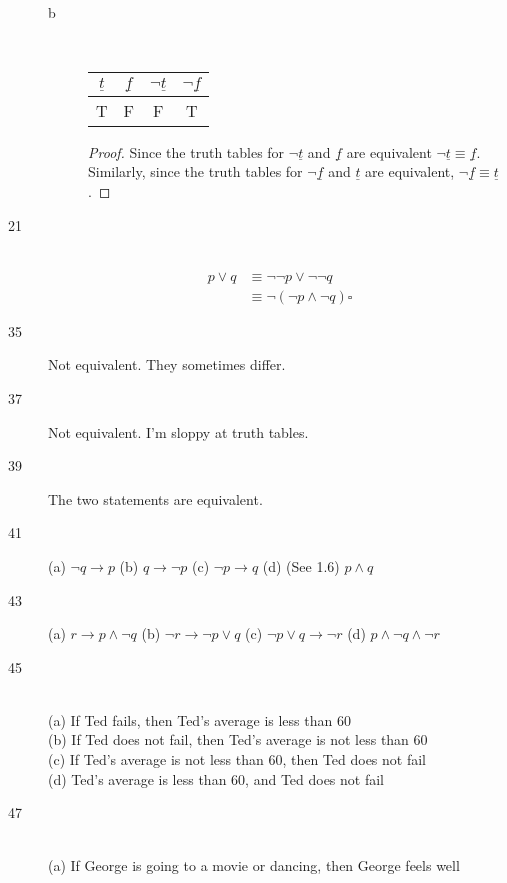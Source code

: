 \begin{description}
\begin{description}
			\item[b] \hfill \\
				\begin{tabular}{c | c | c | c}
					$\underline{t}$ & %
					$\underline{f}$ & %
					$\lnot \underline{t}$ & %
					$\lnot \underline{f}$ \\ %
					\hline
					T & F & F & T \\
				\end{tabular}
				\begin{proof}
					Since the truth tables for $\lnot \underline{t}$ and $\underline{f}$
					are equivalent $\lnot \underline{t} \equiv \underline{f}$. Similarly, since
					the truth tables for $\lnot \underline{f}$ and $\underline{t}$ are equivalent,
					$\lnot \underline{f} \equiv \underline{t}$.
				\end{proof}
		\end{description}
	\item[21] \hfill \\
		\begin{align*}
			p \lor q 
			&\equiv \lnot \lnot p \lor \lnot \lnot q 		\tag*{Double Negativity}
			\\&\equiv \lnot(\lnot p \land \lnot q) \square	\tag*{DeMorgan's Laws}
		\end{align*}
	\item[35] Not equivalent. They sometimes differ.
	\item[37] Not equivalent. I'm sloppy at truth tables.
	\item[39] The two statements are equivalent. 
	\item[41] 
		(a) $\lnot q \rightarrow p$
		(b) $q \rightarrow \lnot p$
		(c) $\lnot p \rightarrow q$
		(d) (See 1.6) $p \land q$
	\item[43] 
		(a) $r \rightarrow p \land \lnot q$
		(b) $\lnot r \rightarrow \lnot p \lor q$
		(c) $\lnot p \lor q \rightarrow \lnot r$
		(d) $p \land \lnot q \land \lnot r$
	\item[45] \hfill \\
		(a) If Ted fails, then Ted's average is less than 60 \\
		(b) If Ted does not fail, then Ted's average is not less than 60 \\
		(c) If Ted's average is not less than 60, then Ted does not fail \\
		(d) Ted's average is less than 60, and Ted does not fail
	\item[47] \hfill \\
		(a) If George is going to a movie or dancing, then George feels well \\

\end{description}
